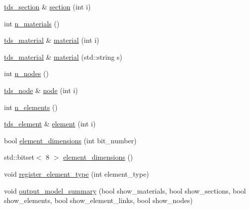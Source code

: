 \begin{DoxyCompactItemize}
\item 
\hyperlink{classtds__section}{tds\-\_\-section} \& \hyperlink{classtds_a09ac79f6931aaf6af64feaca4f167409}{section} (int i)
\item 
int \hyperlink{classtds_a3d95be9cb7cd20cd89144033f6f808b8}{n\-\_\-materials} ()
\item 
\hyperlink{classtds__material}{tds\-\_\-material} \& \hyperlink{classtds_ac62efbdbea35b9f2af42a7b184eba992}{material} (int i)
\item 
\hyperlink{classtds__material}{tds\-\_\-material} \& \hyperlink{classtds_af680ffcaf2c50cd226f551f33cc351de}{material} (std\-::string s)
\item 
int \hyperlink{classtds_a59b1fe5843f09e2fe2316d3ba340bac2}{n\-\_\-nodes} ()
\item 
\hyperlink{classtds__node}{tds\-\_\-node} \& \hyperlink{classtds_acfd60141492b80d9c0e2edb1542af11e}{node} (int i)
\item 
int \hyperlink{classtds_aa345b4a615773c12b30a9f7880775d03}{n\-\_\-elements} ()
\item 
\hyperlink{classtds__element}{tds\-\_\-element} \& \hyperlink{classtds_aec8ca7ac2f04016feeac7bb3f06da314}{element} (int i)
\item 
bool \hyperlink{classtds_a011b6ab393bba61616bca5039ad1f69d}{element\-\_\-dimensions} (int bit\-\_\-number)
\item 
std\-::bitset$<$ 8 $>$ \hyperlink{classtds_a3d31ef1f680a71a98545174b4a52d55d}{element\-\_\-dimensions} ()
\item 
void \hyperlink{classtds_ac3ecc9ac7957074b65f4db63f5e6ad3e}{register\-\_\-element\-\_\-type} (int element\-\_\-type)
\item 
void \hyperlink{classtds_a7071fbcd6cb5fcd12f4a91d4d47627c3}{output\-\_\-model\-\_\-summary} (bool show\-\_\-materials, bool show\-\_\-sections, bool show\-\_\-elements, bool show\-\_\-element\-\_\-links, bool show\-\_\-nodes)
\end{DoxyCompactItemize}
